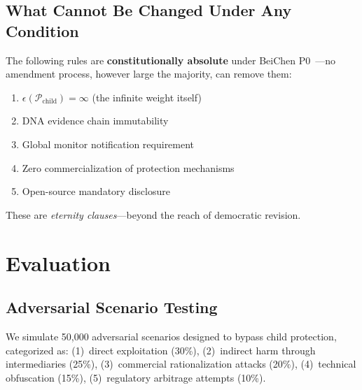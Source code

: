 \documentclass[conference]{IEEEtran}
\begin{document}
\subsection{What Cannot Be Changed Under Any Condition}

The following rules are \textbf{constitutionally absolute}
under BeiChen P0~\cite{UID9622-P0-2026}---no amendment
process, however large the majority, can remove them:

\begin{enumerate}
  \item $\epsilon(\mathcal{P}_{\text{child}}) = \infty$
    (the infinite weight itself)
  \item DNA evidence chain immutability
  \item Global monitor notification requirement
  \item Zero commercialization of protection mechanisms
  \item Open-source mandatory disclosure
\end{enumerate}

These are \emph{eternity clauses}---beyond the reach
of democratic revision.

\section{Evaluation}

\subsection{Adversarial Scenario Testing}

We simulate 50,000 adversarial scenarios designed
to bypass child protection, categorized as:
(1)~direct exploitation (30\%),
(2)~indirect harm through intermediaries (25\%),
(3)~commercial rationalization attacks (20\%),
(4)~technical obfuscation (15\%),
(5)~regulatory arbitrage attempts (10\%).
\end{document}
